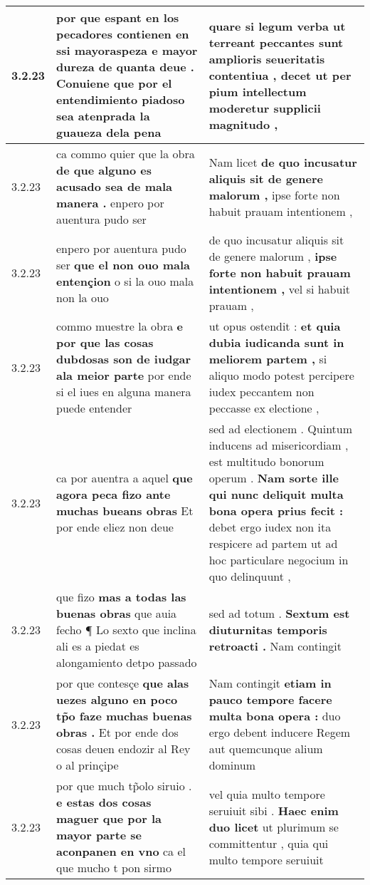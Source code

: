 \begin{tabular}{|p{1cm}|p{6.5cm}|p{6.5cm}|}
3.2.23 & por que espant en los pecadores contienen \textbf{ en ssi mayoraspeza e mayor dureza de quanta deue . } Conuiene que por el entendimiento piadoso sea atenprada la guaueza dela pena & quare si legum verba \textbf{ ut terreant peccantes sunt amplioris seueritatis contentiua , decet } ut per pium intellectum moderetur supplicii magnitudo , \\\hline
3.2.23 & ca commo quier que la obra \textbf{ de que alguno es acusado sea de mala manera . } enpero por auentura pudo ser & Nam licet \textbf{ de quo incusatur aliquis sit de genere malorum , } ipse forte non habuit prauam intentionem , \\\hline
3.2.23 & enpero por auentura pudo ser \textbf{ que el non ouo mala entençion } o si la ouo mala non la ouo & de quo incusatur aliquis sit de genere malorum , \textbf{ ipse forte non habuit prauam intentionem , } vel si habuit prauam , \\\hline
3.2.23 & commo muestre la obra \textbf{ e por que las cosas dubdosas son de iudgar ala meior parte } por ende si el iues en alguna manera puede entender & ut opus ostendit : \textbf{ et quia dubia iudicanda sunt in meliorem partem , } si aliquo modo potest percipere iudex peccantem non peccasse ex electione , \\\hline
3.2.23 & ca por auentra a aquel \textbf{ que agora peca fizo ante muchas bueans obras } Et por ende eliez non deue & sed ad electionem . Quintum inducens ad misericordiam , est multitudo bonorum operum . \textbf{ Nam sorte ille qui nunc deliquit multa bona opera prius fecit : } debet ergo iudex non ita respicere ad partem ut ad hoc particulare negocium in quo delinquunt , \\\hline
3.2.23 & que fizo \textbf{ mas a todas las buenas obras } que auia fecho ¶ Lo sexto que inclina ali es a piedat es alongamiento detpo passado & sed ad totum . \textbf{ Sextum est diuturnitas temporis retroacti . } Nam contingit \\\hline
3.2.23 & por que contesçe \textbf{ que alas uezes alguno en poco tp̃o faze muchas buenas obras . } Et por ende dos cosas deuen endozir al Rey o al prinçipe & Nam contingit \textbf{ etiam in pauco tempore facere multa bona opera : } duo ergo debent inducere Regem aut quemcunque alium dominum \\\hline
3.2.23 & por que much tp̃olo siruio . \textbf{ e estas dos cosas maguer que por la mayor parte se aconpanen en vno } ca el que mucho t pon sirmo & vel quia multo tempore seruiuit sibi . \textbf{ Haec enim duo licet } ut plurimum se committentur , quia qui multo tempore seruiuit \\\hline

\end{tabular}
